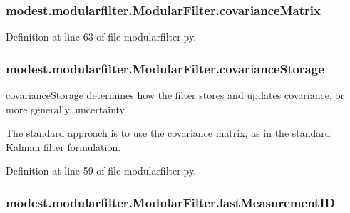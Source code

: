\subsubsection[{\texorpdfstring{covariance\+Matrix}{covarianceMatrix}}]{\setlength{\rightskip}{0pt plus 5cm}modest.\+modularfilter.\+Modular\+Filter.\+covariance\+Matrix}\hypertarget{classmodest_1_1modularfilter_1_1ModularFilter_ac1b2e8a44ee25a8a2935e6e44a8409e5}{}\label{classmodest_1_1modularfilter_1_1ModularFilter_ac1b2e8a44ee25a8a2935e6e44a8409e5}


Definition at line 63 of file modularfilter.\+py.

\subsubsection[{\texorpdfstring{covariance\+Storage}{covarianceStorage}}]{\setlength{\rightskip}{0pt plus 5cm}modest.\+modularfilter.\+Modular\+Filter.\+covariance\+Storage}\hypertarget{classmodest_1_1modularfilter_1_1ModularFilter_a96114547940eb463174477fe4612c999}{}\label{classmodest_1_1modularfilter_1_1ModularFilter_a96114547940eb463174477fe4612c999}


covariance\+Storage determines how the filter stores and updates covariance, or more generally, uncertainty. 

The standard approach is to use the covariance matrix, as in the standard Kalman filter formulation. 

Definition at line 59 of file modularfilter.\+py.

\subsubsection[{\texorpdfstring{last\+Measurement\+ID}{lastMeasurementID}}]{\setlength{\rightskip}{0pt plus 5cm}modest.\+modularfilter.\+Modular\+Filter.\+last\+Measurement\+ID}\hypertarget{classmodest_1_1modularfilter_1_1ModularFilter_adc22328f3634e2b7bdeff883a7398538}{}\label{classmodest_1_1modularfilter_1_1ModularFilter_adc22328f3634e2b7bdeff883a7398538}



